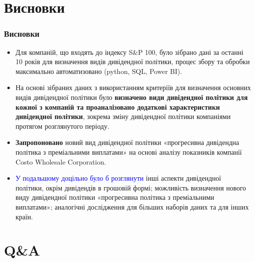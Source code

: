 \documentclass[aspectratio=169]{beamer}
\begin{document}
\section{Висновки}

\begin{frame}
\frametitle{Висновки}
\begin{itemize}
\item Для компаній, що
входять до індексу S\&P 100, було зібрано дані за останні 10
років для визначення видів дивідендної політики, процес збору та обробки максимально автоматизовано (python, SQL, Power BI).
\smallskip
\item На основі зібраних даних з використанням критеріїв для визначення основних видів дивідендної політики було \alert {\textbf{визначено види дивідендної політики для кожної з компаній та проаналізовано додаткові характеристики дивідендної політики}}, зокрема зміну дивідендної політики компаніями протягом розглянутого періоду.
\smallskip
\item \alert {\textbf{Запропоновано}} новий вид дивідендної політики \alert {«прогресивна дивідендна політика з преміальними виплатами»} на основі аналізу показників компанії Costo Wholesale Corporation. 
\smallskip
{}
\item \textcolor{blue} {У подальшому доцільно було б розглянути} інші аспекти дивідендної політики, окрім дивідендів в грошовій формі; можливість визначення нового виду дивідендної політики «прогресивна політика з преміальними виплатами»; аналогічні дослідження для більших наборів даних та для інших країн.
\bigskip
\end{itemize}
\end{frame}

\section{Q\&A}
\end{document}
